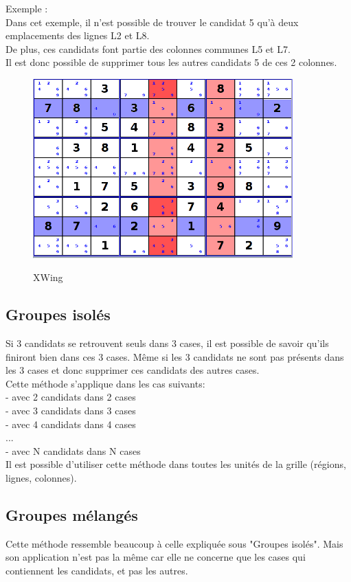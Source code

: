 Exemple :\\
Dans cet exemple, il n'est possible de trouver le candidat 5 
qu'à deux emplacements des lignes L2 et L8.\\ 
De plus, ces candidats font partie des colonnes communes L5 et L7.\\ 
Il est donc possible de supprimer tous les autres candidats 5 de ces 2 colonnes. 

\begin{figure}[ht]
  \caption{\label{annexe5} XWing}
  \includegraphics [width=100mm]{images/XWing.png} \\[0.5cm]
\end{figure}

\newpage

\subsection{Groupes isolés}
Si 3 candidats se retrouvent seuls dans 3 cases, il est possible de savoir qu'ils finiront bien dans ces 3 cases. 
Même si les 3 candidats ne sont pas présents dans les 3 cases et donc supprimer ces candidats des autres cases.
\\
Cette méthode s'applique dans les cas suivants:\\
- avec 2 candidats dans 2 cases\\
- avec 3 candidats dans 3 cases\\
- avec 4 candidats dans 4 cases\\
...\\
- avec N candidats dans N cases\\

Il est possible d'utiliser cette méthode dans toutes les unités de la grille (régions, lignes, colonnes).

\subsection{Groupes mélangés}
Cette méthode ressemble beaucoup à celle expliquée sous "Groupes isolés". 
Mais son application n'est pas la même car elle ne concerne que les cases qui contiennent les candidats, 
et pas les autres.\\
\\

